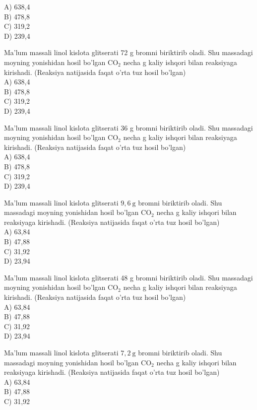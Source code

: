 A) 638,4\\
B) 478,8\\
C) 319,2\\
D) 239,4
  \item Ma'lum massali linol kislota glitserati 72 g bromni biriktirib oladi. Shu massadagi moyning yonishidan hosil bo'lgan $\mathrm{CO}_{2}$ necha g kaliy ishqori bilan reaksiyaga kirishadi. (Reaksiya natijasida faqat o'rta tuz hosil bo'lgan)\\
A) 638,4\\
B) 478,8\\
C) 319,2\\
D) 239,4
  \item Ma'lum massali linol kislota glitserati 36 g bromni biriktirib oladi. Shu massadagi moyning yonishidan hosil bo'lgan $\mathrm{CO}_{2}$ necha g kaliy ishqori bilan reaksiyaga kirishadi. (Reaksiya natijasida faqat o'rta tuz hosil bo'lgan)\\
A) 638,4\\
B) 478,8\\
C) 319,2\\
D) 239,4
  \item Ma'lum massali linol kislota glitserati $9,6 \mathrm{~g}$ bromni biriktirib oladi. Shu massadagi moyning yonishidan hosil bo'lgan $\mathrm{CO}_{2}$ necha g kaliy ishqori bilan reaksiyaga kirishadi. (Reaksiya natijasida faqat o'rta tuz hosil bo'lgan)\\
A) 63,84\\
B) 47,88\\
C) 31,92\\
D) 23,94
  \item Ma'lum massali linol kislota glitserati 48 g bromni biriktirib oladi. Shu massadagi moyning yonishidan hosil bo'lgan $\mathrm{CO}_{2}$ necha g kaliy ishqori bilan reaksiyaga kirishadi. (Reaksiya natijasida faqat o'rta tuz hosil bo'lgan)\\
A) 63,84\\
B) 47,88\\
C) 31,92\\
D) 23,94
  \item Ma'lum massali linol kislota glitserati $7,2 \mathrm{~g}$ bromni biriktirib oladi. Shu massadagi moyning yonishidan hosil bo'lgan $\mathrm{CO}_{2}$ necha g kaliy ishqori bilan reaksiyaga kirishadi. (Reaksiya natijasida faqat o'rta tuz hosil bo'lgan)\\
A) 63,84\\
B) 47,88\\
C) 31,92\\
